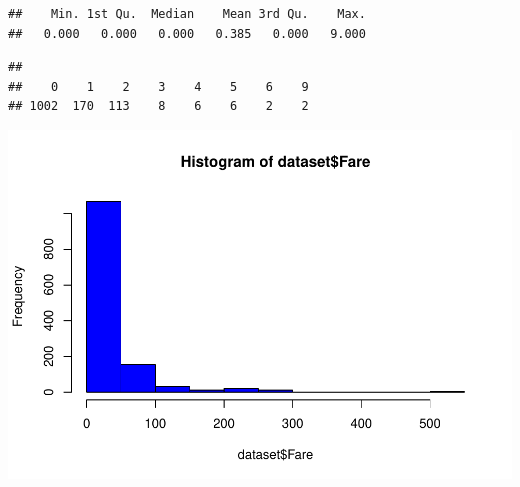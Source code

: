 \documentclass[
]{article}
\newenvironment{Shaded}{\begin{snugshade}}{\end{snugshade}}
\newcommand{\AttributeTok}[1]{\textcolor[rgb]{0.80,0.80,0.80}{#1}}
\newcommand{\CommentTok}[1]{\textcolor[rgb]{0.50,0.62,0.50}{#1}}
\newcommand{\FunctionTok}[1]{\textcolor[rgb]{0.94,0.94,0.56}{#1}}
\newcommand{\NormalTok}[1]{\textcolor[rgb]{0.80,0.80,0.80}{#1}}
\newcommand{\SpecialCharTok}[1]{\textcolor[rgb]{0.86,0.64,0.64}{#1}}
\newcommand{\StringTok}[1]{\textcolor[rgb]{0.80,0.58,0.58}{#1}}
\begin{document}
\begin{Shaded}
\end{Shaded}

\begin{verbatim}
##    Min. 1st Qu.  Median    Mean 3rd Qu.    Max. 
##   0.000   0.000   0.000   0.385   0.000   9.000
\end{verbatim}

\begin{Shaded}
\end{Shaded}

\begin{verbatim}
## 
##    0    1    2    3    4    5    6    9 
## 1002  170  113    8    6    6    2    2
\end{verbatim}

\begin{Shaded}
\end{Shaded}

\includegraphics{titanic-analysis_files/figure-latex/unnamed-chunk-14-6.pdf}
\end{document}
